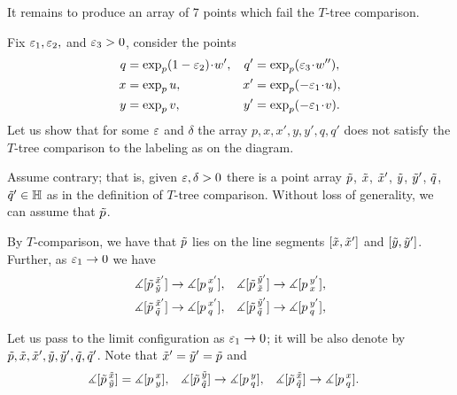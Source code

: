 \begin{wrapfigure}{r}{26 mm}
\end{wrapfigure}

It remains to produce an array of 7 points which fail the $T$-tree comparison.

Fix $\eps_1,\eps_2,$ and $\eps_3>0$, consider the points
\begin{align*}
q&=\exp_p(1-\eps_2)\cdot w',
&
q'&=\exp_p(\eps_3\cdot w''),
\\
x&=\exp_p u,
&
x'&=\exp_p (-\eps_1\cdot u),
\\
y&=\exp_p v,
&
y'&=\exp_p (-\eps_1\cdot v).
\end{align*}
Let us show that for some $\eps$ and $\delta$ the array $p,x,x',y,y',q,q'$ does not satisfy the $T$-tree comparison to the labeling as on the diagram.

Assume contrary; that is, given $\eps,\delta>0$ there is a point array $\~p$, $\~x$, $\~x'$, $\~y$, $\~y'$, $\~q$, $\~q'\in\HH$ as in the definition of $T$-tree comparison.
Without loss of generality, we can assume that $\~p$.

By $T$-comparison, we have that $\~p$ lies on the line segments $[\~x,\~x']$ and $[\~y,\~y']$.
Further, as $\eps_1\to 0$ we have 
\begin{align*}
\measuredangle[\~p\,^{\~x'}_{\~y}]&\to \measuredangle[p\,^{x'}_{y}],
&
\measuredangle[\~p\,^{\~y'}_{\~x}]&\to \measuredangle[p\,^{y'}_{x}],
\\
\measuredangle[\~p\,^{\~x'}_{\~q}]&\to \measuredangle[p\,^{x'}_{q}],
&
\measuredangle[\~p\,^{\~y'}_{\~q}]&\to \measuredangle[p\,^{y'}_{q}],
\end{align*}

Let us pass to the limit configuration as $\eps_1\to0$;
it will be also denote by $\~p,\~x,\~x',\~y,\~y',\~q,\~q'$.
Note that $\~x'=\~y'=\~p$ and 
\begin{align*}
\measuredangle[\~p\,^{\~x}_{\~y}]&= \measuredangle[p\,^{x}_{y}],
&
\measuredangle[\~p\,^{\~y}_{\~q}]&\to \measuredangle[p\,^{y}_{q}],
&
\measuredangle[\~p\,^{\~x}_{\~q}]&\to \measuredangle[p\,^{x}_{q}].
\end{align*}

